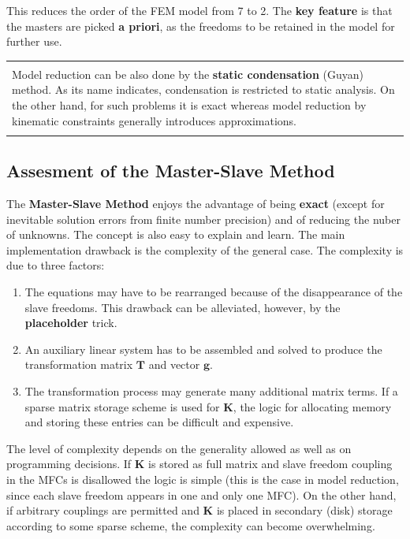 \documentclass[10pt,b5paper,titlepage]{book}
\newenvironment{bbox}[1][0.96]
{
    \begin{center}
        \begin{tabular}{|p{#1\textwidth}|}
            \hline\\
}
{
            \\\\\hline
        \end{tabular}
    \end{center}
}
\begin{document}
This reduces the order of the FEM model from 7 to 2. The \textbf{key feature} is that
the masters are picked \textbf{a priori}, as the freedoms to be retained in the
model for further use.

\begin{bbox}
    Model reduction can be also done by the \textbf{static condensation} (Guyan)
    method. As its name indicates, condensation is restricted to static analysis.
    On the other hand, for such problems it is exact whereas model reduction by
    kinematic constraints generally introduces approximations.
\end{bbox}


\subsection{Assesment of the Master-Slave Method}

The \textbf{Master-Slave Method} enjoys the advantage of being \textbf{exact}
(except for inevitable solution errors from finite number precision) and of
reducing the nuber of unknowns. The concept is also easy to explain and learn.
The main implementation drawback is the complexity of the general case.
The complexity is due to three factors:

\begin{enumerate}
    \item The equations may have to be rearranged because of the disappearance
        of the slave freedoms. This drawback can be alleviated, however,
        by the \textbf{placeholder} trick.

    \item An auxiliary linear system has to be assembled and solved to produce
        the transformation matrix $ \mathbf{T} $ and vector $ \mathbf{g} $.

    \item The transformation process may generate many additional matrix terms.
        If a sparse matrix storage scheme is used for $ \mathbf{K} $, the logic
        for allocating memory and storing these entries can be difficult
        and expensive.
\end{enumerate}

The level of complexity depends on the generality allowed as well as on programming
decisions. If $ \mathbf{K} $  is stored as full matrix and slave freedom coupling in
the MFCs is disallowed the logic is simple (this is the case in model reduction,
since each slave freedom appears in one and only one MFC). On the other hand,
if arbitrary couplings are permitted and $ \mathbf{K} $ is placed in secondary
(disk) storage according to some sparse scheme, the complexity can become
overwhelming.
\end{document}
